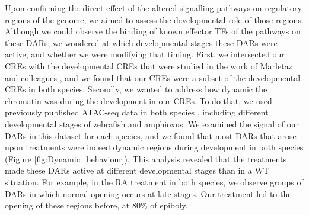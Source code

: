 Upon confirming the direct effect of the altered signalling pathways on regulatory regions of the genome, we aimed to assess the developmental role of those regions. Although we could observe the binding of known effector TFs of the pathways on these DARs, we wondered at which developmental stages these DARs were active, and whether we were modifying that timing. First, we intersected our CREs with the developmental CREs that were studied in the work of Marletaz and colleagues \parencite{marletaz_amphioxus_2018}, and we found that our CREs were a subset of the developmental CREs in both species. Secondly, we wanted to address how dynamic the chromatin was during the development in our CREs. To do that, we used previously published ATAC-seq data in both species \parencite{marletaz_amphioxus_2018}, including different developmental stages of zebrafish and amphioxus. We examined the signal of our DARs in this dataset for each species, and we found that most DARs that arose upon treatments were indeed dynamic regions during development in both species (Figure \ref{fig:Dynamic_behaviour}). This analysis revealed that the treatments made these DARs active at different developmental stages than in a WT situation. For example, in the RA treatment in both species, we observe groups of DARs in which normal opening occurs at late stages. Our treatment led to the opening of these regions before, at 80\% of epiboly.



